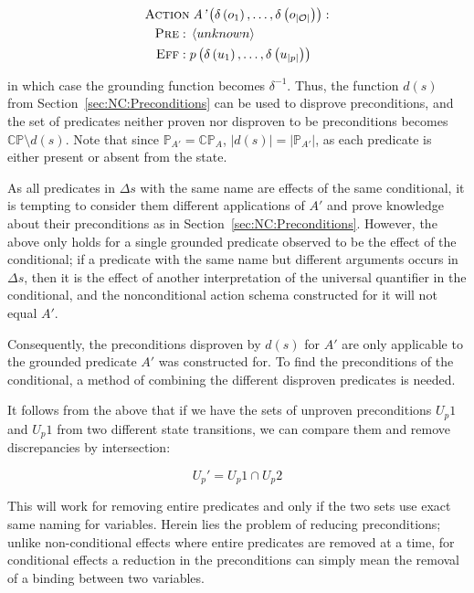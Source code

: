 \documentclass[\master/Master.tex]{subfiles}
\begin{document}
\begin{align*}
    \begin{split}
        \textsc{Action} &\; \textit{A'}\left(\delta \left( o_1 \right), \ldots, \delta \left( o_{|\mathcal{O}|}\right)\right): \\
        \textsc{Pre}: \; & \left< unknown \right> \\
        \textsc{Eff}: \; & p\left( \delta \left(u_1\right), \dots, \delta \left( u_{|p|} \right)\right)
    \end{split}
\end{align*}

in which case the grounding function becomes $\delta^{-1}$. Thus, the function $d(s)$ from Section~\ref{sec:NC:Preconditions} can be used to disprove preconditions, and the set of predicates neither proven nor disproven to be preconditions becomes $\mathbb{CP} \setminus d(s)$. Note that since $\mathbb{P}_{A'} = \mathbb{CP}_A$, $|d(s)| = |\mathbb{P}_{A'}|$, as each predicate is either present or absent from the state. 

As all predicates in $\Delta s$ with the same name are effects of the same conditional, it is tempting to consider them different applications of $A'$ and prove knowledge about their preconditions as in Section~\ref{sec:NC:Preconditions}. However, the above only holds for a single grounded predicate observed to be the effect of the conditional; if a predicate with the same name but different arguments occurs in $\Delta s$, then it is the effect of another interpretation of the universal quantifier in the conditional, and the nonconditional action schema constructed for it will not equal $A'$.

Consequently, the preconditions disproven by $d(s)$ for $A'$ are only applicable to the grounded predicate $A'$ was constructed for. To find the preconditions of the conditional, a method of combining the different disproven predicates is needed.

It follows from the above that if we have the sets of unproven preconditions $U_p1$ and $U_p1$ from two different state transitions, we can compare them and remove discrepancies by intersection:

\begin{equation}
\label{eq:unknownpredcondset}
	U_p' = U_p1 \cap U_p2
\end{equation}

This will work for removing entire predicates and only if the two sets use exact same naming for variables. Herein lies the problem of reducing preconditions; unlike non-conditional effects where entire predicates are removed at a time, for conditional effects a reduction in the preconditions can simply mean the removal of a binding between two variables.
\end{document}
